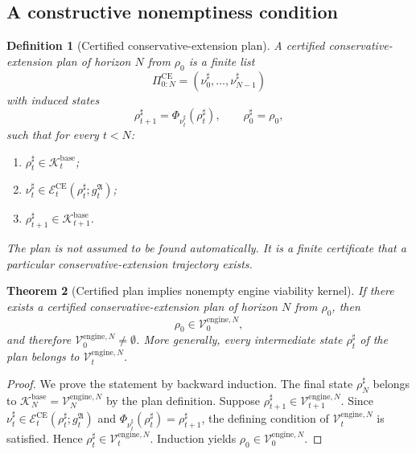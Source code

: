 \documentclass[11pt]{article}
\newtheorem{theorem}{Theorem}[section]
\newtheorem{definition}[theorem]{Definition}
\newcommand{\Ecal}{\mathcal{E}}
\newcommand{\1}{\mathbf{1}}
\providecommand{\Kcal}{\mathcal{K}}
\providecommand{\Vcal}{\mathcal{V}}
\begin{document}
\subsection{A constructive nonemptiness condition}

\begin{definition}[Certified conservative-extension plan]
\label{def:certified_conservative_extension_plan}
A certified conservative-extension plan of horizon \(N\) from \(\rho_0\) is a finite list
\[
\Pi_{0:N}^{\mathrm{CE}}
=
(\nu_0^{\sharp},\ldots,\nu_{N-1}^{\sharp})
\]
with induced states
\[
\rho_{t+1}^{\sharp}=\Phi_{\nu_t^{\sharp}}(\rho_t^{\sharp}),
\qquad
\rho_0^{\sharp}=\rho_0,
\]
such that for every \(t<N\):
\begin{enumerate}[label=(\roman*),leftmargin=1.5em]
    \item \(\rho_t^{\sharp}\in\Kcal_t^{\mathrm{base}}\);
    \item \(\nu_t^{\sharp}\in\Ecal_t^{\mathrm{CE}}(\rho_t^{\sharp};g_t^{\mathfrak A})\);
    \item \(\rho_{t+1}^{\sharp}\in\Kcal_{t+1}^{\mathrm{base}}\).
\end{enumerate}
The plan is not assumed to be found automatically.  It is a finite certificate that a particular conservative-extension trajectory exists.
\end{definition}

\begin{theorem}[Certified plan implies nonempty engine viability kernel]
\label{thm:certified_plan_implies_nonempty_engine_viability}
If there exists a certified conservative-extension plan of horizon \(N\) from \(\rho_0\), then
\[
\rho_0\in\Vcal_0^{\mathrm{engine},N},
\]
and therefore \(\Vcal_0^{\mathrm{engine},N}\neq\emptyset\).  More generally, every intermediate state \(\rho_t^{\sharp}\) of the plan belongs to \(\Vcal_t^{\mathrm{engine},N}\).
\end{theorem}

\begin{proof}
We prove the statement by backward induction.  The final state \(\rho_N^{\sharp}\) belongs to \(\Kcal_N^{\mathrm{base}}=\Vcal_N^{\mathrm{engine},N}\) by the plan definition.  Suppose \(\rho_{t+1}^{\sharp}\in\Vcal_{t+1}^{\mathrm{engine},N}\).  Since \(\nu_t^{\sharp}\in\Ecal_t^{\mathrm{CE}}(\rho_t^{\sharp};g_t^{\mathfrak A})\) and \(\Phi_{\nu_t^{\sharp}}(\rho_t^{\sharp})=\rho_{t+1}^{\sharp}\), the defining condition of \(\Vcal_t^{\mathrm{engine},N}\) is satisfied.  Hence \(\rho_t^{\sharp}\in\Vcal_t^{\mathrm{engine},N}\).  Induction yields \(\rho_0\in\Vcal_0^{\mathrm{engine},N}\).
\end{proof}
\end{document}
